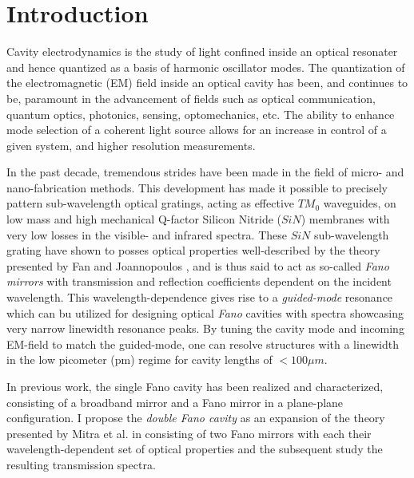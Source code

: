 \newpage
\section{Introduction}

Cavity electrodynamics is the study of light confined inside an optical resonater and hence quantized as a basis of harmonic oscillator modes. The quantization of the electromagnetic (EM) field inside an optical cavity has been, and continues to be, paramount in the advancement of fields such as optical communication, quantum optics, photonics, sensing, optomechanics, etc. The ability to enhance mode selection of a coherent light source allows for an increase in control of a given system, and higher resolution measurements. 

In the past decade, tremendous strides have been made in the field of micro- and nano-fabrication methods. This development has made it possible to precisely pattern sub-wavelength optical gratings, acting as effective $TM_0$ waveguides, on low mass and high mechanical Q-factor Silicon Nitride ($SiN$) membranes with very low losses in the visible- and infrared spectra. These $SiN$ sub-wavelength grating have shown to posses optical properties well-described by the theory presented by Fan and Joannopoulos \cite{Fan-Joannopoulos-guided-mode-resonance} \cite{Fan-Joannopoulos-fano-resonance}, and is thus said to act as so-called \emph{Fano mirrors} with transmission and reflection coefficients dependent on the incident wavelength. This wavelength-dependence gives rise to a \emph{guided-mode} resonance which can bu utilized for designing optical \emph{Fano} cavities with spectra showcasing very narrow linewidth resonance peaks. By tuning the cavity mode and incoming EM-field to match the guided-mode, one can resolve structures with a linewidth in the low picometer (pm) regime for cavity lengths of $< 100 \mu m$. 

In previous work, the single Fano cavity has been realized and characterized, consisting of a broadband mirror and a Fano mirror in a plane-plane configuration. I propose the \emph{double Fano cavity} as an expansion of the theory presented by Mitra et al. in \cite{Mitra} consisting of two Fano mirrors with each their wavelength-dependent set of optical properties and the subsequent study the resulting transmission spectra. 

